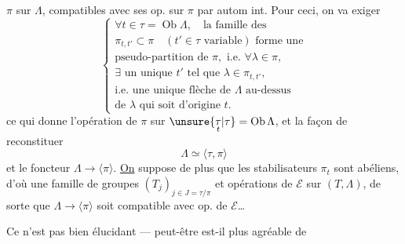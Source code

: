 $\pi$ sur $\Lambda$, compatibles avec ses op. sur $\pi$ par autom int. Pour ceci, on va exiger
\[
\left\{\begin{gathered}
\forall t\in\tau=\operatorname{Ob}\Lambda,\quad\text{la famille des}\\
\pi_{t,t'}\subset\pi\quad(t'\in\tau\text{ variable})\text{ forme une}\\
\text{pseudo-partition de }\pi,\text{ i.e. }\forall\lambda\in\pi,\\
\exists\text{ un unique }t'\text{ tel que }\lambda\in\pi_{t,t'},\\
\text{i.e. une unique flèche de }\Lambda\text{ au-dessus}\\
\text{de }\lambda\text{ qui soit d'origine }t.
\end{gathered}\right.
\]
ce qui donne l'opération de $\pi$ sur $\unsure{\underset{t}{\tau}|\tau}=\operatorname{Ob}\Lambda$, et la façon de reconstituer
\[
\Lambda\simeq\langle\tau,\pi\rangle
\]
et le foncteur $\Lambda\longrightarrow\langle\pi\rangle$. \uline{On}  suppose de plus que les stabilisateurs $\pi_t$ sont abéliens, d'où une famille de groupes $(T_j)_{j\in J=\tau/\pi}$ et opérations de $\mathcal E$ sur $(T,\Lambda)$, de sorte que $\Lambda\longrightarrow\langle\pi\rangle$ soit compatible avec op. de $\mathcal E$\ldots

Ce n'est pas bien élucidant --- peut-être est-il plus agréable de
